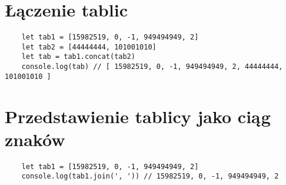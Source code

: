 \documentclass[a4paper]{article}
\begin{document}
\section{Łączenie tablic}
\begin{verbatim}
    let tab1 = [15982519, 0, -1, 949494949, 2]
    let tab2 = [44444444, 101001010]
    let tab = tab1.concat(tab2)
    console.log(tab) // [ 15982519, 0, -1, 949494949, 2, 44444444, 101001010 ]
\end{verbatim}
\section{Przedstawienie tablicy jako ciąg znaków}
\begin{verbatim}
    let tab1 = [15982519, 0, -1, 949494949, 2]
    console.log(tab1.join(', ')) // 15982519, 0, -1, 949494949, 2
\end{verbatim}
\end{document}
